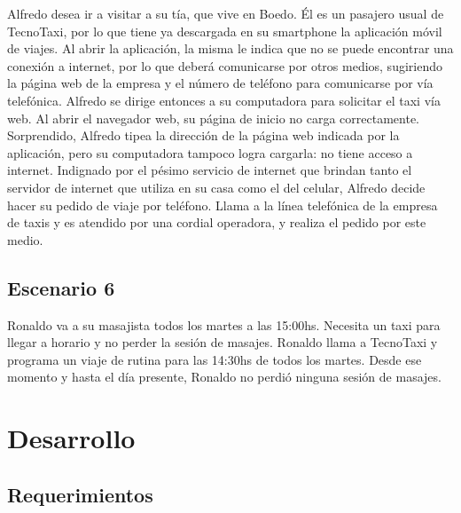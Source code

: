 \documentclass[a4paper, 10pt, twoside]{article}
\begin{document}
Alfredo desea ir a visitar a su tía, que vive en Boedo. Él es un pasajero usual de TecnoTaxi, por lo que tiene ya descargada en su smartphone la aplicación móvil de viajes. Al abrir la aplicación, la misma le indica que no se puede encontrar una conexión a internet, por lo que deberá comunicarse por otros medios, sugiriendo la página web de la empresa y el número de teléfono para comunicarse por vía telefónica. Alfredo se dirige entonces a su computadora para solicitar el taxi vía web. Al abrir el navegador web, su página de inicio no carga correctamente. Sorprendido, Alfredo tipea la dirección de la página web indicada por la aplicación, pero su computadora tampoco logra cargarla: no tiene acceso a internet. Indignado por el pésimo servicio de internet que brindan tanto el servidor de internet que utiliza en su casa como el del celular, Alfredo decide hacer su pedido de viaje por teléfono. Llama a la línea telefónica de la empresa de taxis y es atendido por una cordial operadora, y realiza el pedido por 
este medio.

\subsection{Escenario 6}

Ronaldo va a su masajista todos los martes a las 15:00hs. Necesita un taxi para llegar a horario y no perder la sesión de masajes. Ronaldo llama a TecnoTaxi y programa un viaje de rutina para las 14:30hs de todos los martes. Desde ese momento y hasta el día presente, Ronaldo no perdió ninguna sesión de masajes.




\section{Desarrollo}

\subsection{Requerimientos}
\end{document}
